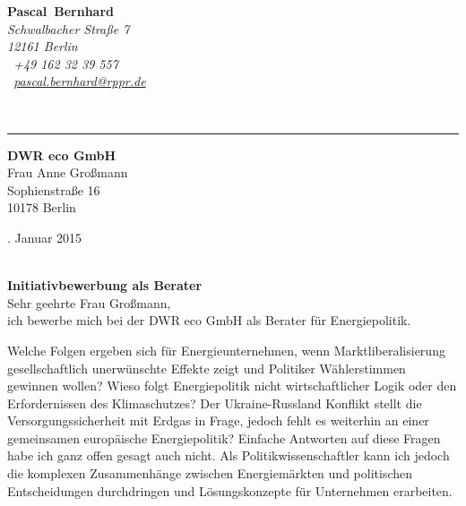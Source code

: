 \documentclass[11pt,a4paper]{article}
\def\firstname{Pascal}
\def\familyname{Bernhard}
\begin{document}
\sffamily   %
\hfill%
\begin{minipage}[t]{.6\textwidth}
	\raggedleft%
	{\bfseries {\color{firstnamecolor}\firstname}~{\color{familynamecolor}\familyname}}\\[.35ex]
	\small\itshape%
	Schwalbacher Straße 7\\
	12161 Berlin\\[.35ex]
	\Mobilefone~+49 162 32 39 557 \\
	\Letter~\href{mailto:pascal.bernhard@rppr.de}{pascal.bernhard@rppr.de}
\end{minipage}\\[0.5em]
%
{\color{firstnamecolor}\rule{\textwidth}{.25ex}}
%
\begin{minipage}[t]{.4\textwidth}
	\raggedright%
	\vspace*{1em}
	\textbf{DWR eco GmbH} \\
	Frau Anne Großmann \\[.35ex]
	\small%
	Sophienstraße 16\\
	10178 Berlin
\end{minipage}
%
\hfill
%
\begin{minipage}[t]{.4\textwidth}
	. Januar 2015

\end{minipage}\\[1em]


{\bfseries \color{familynamecolor}Initiativbewerbung als Berater}\\[0.75em]

Sehr geehrte Frau Großmann,\\[0.5em]
%
ich bewerbe mich bei der DWR eco GmbH als Berater für Energiepolitik.

Welche Folgen ergeben sich für Energieunternehmen, wenn Marktliberalisierung gesellschaftlich unerwünschte Effekte zeigt und Politiker Wählerstimmen gewinnen wollen? Wieso folgt Energiepolitik nicht wirtschaftlicher Logik oder den Erfordernissen des Klimaschutzes? Der Ukraine-Russland Konflikt stellt die Versorgungssicherheit mit Erdgas in Frage, jedoch fehlt es weiterhin an einer gemeinsamen europäische Energiepolitik? Einfache Antworten auf diese Fragen habe ich ganz offen gesagt auch nicht. Als Politikwissenschaftler kann ich jedoch die komplexen Zusammenhänge zwischen Energiemärkten und politischen Entscheidungen durchdringen und Lösungskonzepte für Unternehmen erarbeiten.
\end{document}
